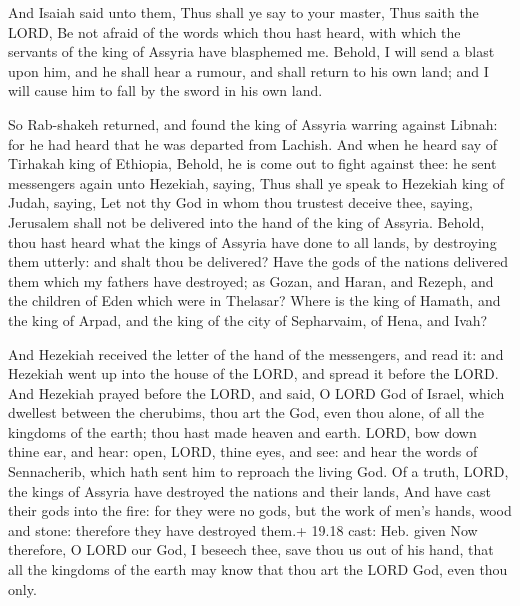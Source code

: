  And Isaiah said unto them, Thus shall ye say to your
master, Thus saith the LORD, Be not afraid of the words which thou hast
heard, with which the servants of the king of Assyria have blasphemed
me.  Behold, I will send a blast upon him, and he shall hear
a rumour, and shall return to his own land; and I will cause him to fall
by the sword in his own land.

 So Rab-shakeh returned, and found the king of Assyria
warring against Libnah: for he had heard that he was departed from
Lachish.  And when he heard say of Tirhakah king of
Ethiopia, Behold, he is come out to fight against thee: he sent
messengers again unto Hezekiah, saying,  Thus shall ye
speak to Hezekiah king of Judah, saying, Let not thy God in whom thou
trustest deceive thee, saying, Jerusalem shall not be delivered into the
hand of the king of Assyria.  Behold, thou hast heard what
the kings of Assyria have done to all lands, by destroying them utterly:
and shalt thou be delivered?  Have the gods of the nations
delivered them which my fathers have destroyed; as Gozan, and Haran, and
Rezeph, and the children of Eden which were in Thelasar? 
Where is the king of Hamath, and the king of Arpad, and the king of the
city of Sepharvaim, of Hena, and Ivah?

 And Hezekiah received the letter of the hand of the
messengers, and read it: and Hezekiah went up into the house of the
LORD, and spread it before the LORD.  And Hezekiah prayed
before the LORD, and said, O LORD God of Israel, which dwellest between
the cherubims, thou art the God, even thou alone, of all the kingdoms of
the earth; thou hast made heaven and earth.  LORD, bow down
thine ear, and hear: open, LORD, thine eyes, and see: and hear the words
of Sennacherib, which hath sent him to reproach the living God.
 Of a truth, LORD, the kings of Assyria have destroyed the
nations and their lands,  And have cast their gods into the
fire: for they were no gods, but the work of men's hands, wood and
stone: therefore they have destroyed them.+ 19.18 cast: Heb. given
 Now therefore, O LORD our God, I beseech thee, save thou
us out of his hand, that all the kingdoms of the earth may know that
thou art the LORD God, even thou only.

